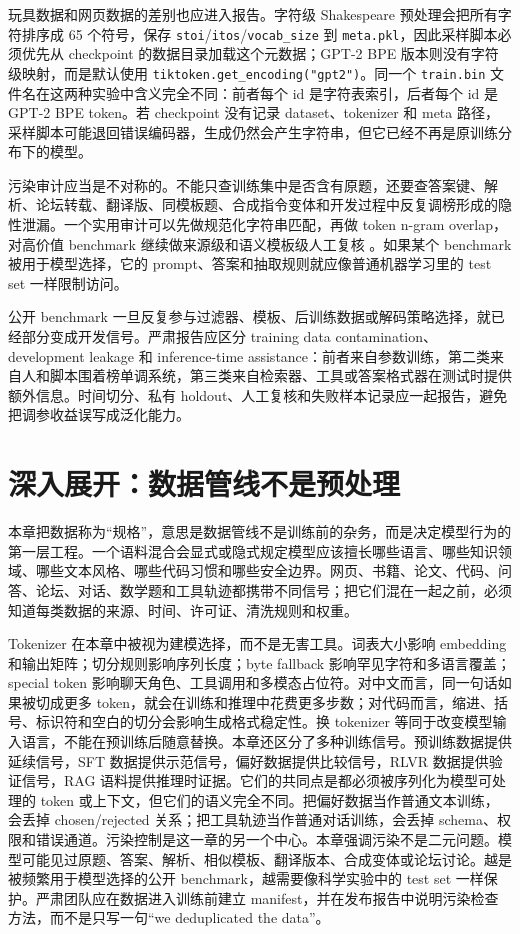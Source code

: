 \documentclass[UTF8,zihao=-4,openany]{ctexbook}
\begin{document}
玩具数据和网页数据的差别也应进入报告。字符级 Shakespeare 预处理会把所有字符排序成 65 个符号，保存 \texttt{stoi}/\texttt{itos}/\texttt{vocab\_size} 到 \texttt{meta.pkl}，因此采样脚本必须优先从 checkpoint 的数据目录加载这个元数据；GPT-2 BPE 版本则没有字符级映射，而是默认使用 \texttt{tiktoken.get\_encoding("gpt2")}。同一个 \texttt{train.bin} 文件名在这两种实验中含义完全不同：前者每个 id 是字符表索引，后者每个 id 是 GPT-2 BPE token。若 checkpoint 没有记录 dataset、tokenizer 和 meta 路径，采样脚本可能退回错误编码器，生成仍然会产生字符串，但它已经不再是原训练分布下的模型。

污染审计应当是不对称的。不能只查训练集中是否含有原题，还要查答案键、解析、论坛转载、翻译版、同模板题、合成指令变体和开发过程中反复调榜形成的隐性泄漏。一个实用审计可以先做规范化字符串匹配，再做 token n-gram overlap，对高价值 benchmark 继续做来源级和语义模板级人工复核 \cite{shi2023detecting,xu2024benchmark}。如果某个 benchmark 被用于模型选择，它的 prompt、答案和抽取规则就应像普通机器学习里的 test set 一样限制访问。

公开 benchmark 一旦反复参与过滤器、模板、后训练数据或解码策略选择，就已经部分变成开发信号。严肃报告应区分 training data contamination、development leakage 和 inference-time assistance：前者来自参数训练，第二类来自人和脚本围着榜单调系统，第三类来自检索器、工具或答案格式器在测试时提供额外信息。时间切分、私有 holdout、人工复核和失败样本记录应一起报告，避免把调参收益误写成泛化能力。

\section{深入展开：数据管线不是预处理}
本章把数据称为“规格”，意思是数据管线不是训练前的杂务，而是决定模型行为的第一层工程。一个语料混合会显式或隐式规定模型应该擅长哪些语言、哪些知识领域、哪些文本风格、哪些代码习惯和哪些安全边界。网页、书籍、论文、代码、问答、论坛、对话、数学题和工具轨迹都携带不同信号；把它们混在一起之前，必须知道每类数据的来源、时间、许可证、清洗规则和权重。

Tokenizer 在本章中被视为建模选择，而不是无害工具。词表大小影响 embedding 和输出矩阵；切分规则影响序列长度；byte fallback 影响罕见字符和多语言覆盖；special token 影响聊天角色、工具调用和多模态占位符。对中文而言，同一句话如果被切成更多 token，就会在训练和推理中花费更多步数；对代码而言，缩进、括号、标识符和空白的切分会影响生成格式稳定性。换 tokenizer 等同于改变模型输入语言，不能在预训练后随意替换。本章还区分了多种训练信号。预训练数据提供延续信号，SFT 数据提供示范信号，偏好数据提供比较信号，RLVR 数据提供验证信号，RAG 语料提供推理时证据。它们的共同点是都必须被序列化为模型可处理的 token 或上下文，但它们的语义完全不同。把偏好数据当作普通文本训练，会丢掉 chosen/rejected 关系；把工具轨迹当作普通对话训练，会丢掉 schema、权限和错误通道。污染控制是这一章的另一个中心。本章强调污染不是二元问题。模型可能见过原题、答案、解析、相似模板、翻译版本、合成变体或论坛讨论。越是被频繁用于模型选择的公开 benchmark，越需要像科学实验中的 test set 一样保护。严肃团队应在数据进入训练前建立 manifest，并在发布报告中说明污染检查方法，而不是只写一句“we deduplicated the data”。
\end{document}
